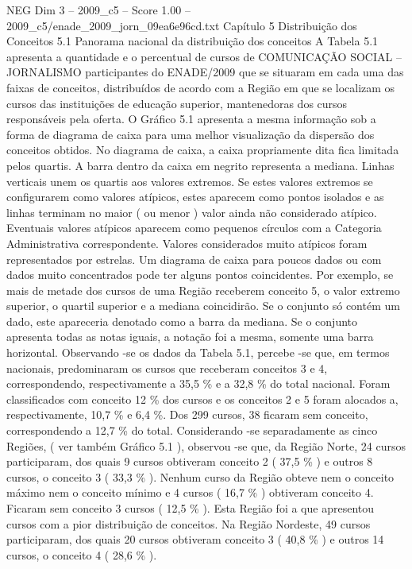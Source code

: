 \begin{textsample}{NEG Dim 3 – 2009\_c5 – Score 1.00 – 2009\_c5/enade\_2009\_jorn\_09ea6e96cd.txt}  \label{ex:f3_neg_112}
Capítulo 5 Distribuição dos Conceitos 5.1 Panorama nacional da distribuição dos conceitos A Tabela 5.1 apresenta a quantidade e o percentual de cursos de COMUNICAÇÃO SOCIAL – JORNALISMO participantes do ENADE/2009 que se situaram em cada uma das faixas de conceitos, distribuídos de acordo com a Região em que se localizam os cursos das instituições de educação superior, mantenedoras dos cursos responsáveis pela oferta.
O Gráfico 5.1 apresenta a mesma informação sob a forma de diagrama de caixa para uma melhor visualização da dispersão dos conceitos obtidos.
No diagrama de caixa, a caixa propriamente dita fica limitada pelos quartis.
A barra dentro da caixa em negrito representa a mediana.
Linhas verticais unem os quartis aos valores extremos.
Se estes valores extremos se configurarem como valores atípicos, estes aparecem como pontos isolados e as linhas terminam no maior ( ou menor ) valor ainda não considerado atípico.
Eventuais valores atípicos aparecem como pequenos círculos com a Categoria Administrativa correspondente.
Valores considerados muito atípicos foram representados por estrelas.
Um diagrama de caixa para poucos dados ou com dados muito concentrados pode ter alguns pontos coincidentes.
Por exemplo, se mais de metade dos cursos de uma Região receberem conceito 5, o valor extremo superior, o quartil superior e a mediana coincidirão.
Se o conjunto só contém um dado, este apareceria denotado como a barra da mediana.
Se o conjunto apresenta todas as notas iguais, a notação foi a mesma, somente uma barra horizontal.
Observando -se os dados da Tabela 5.1, percebe -se que, em termos nacionais, predominaram os cursos que receberam conceitos 3 e 4, correspondendo, respectivamente a 35,5 \% e a 32,8 \% do total nacional.
Foram classificados com conceito 12 \% dos cursos e os conceitos 2 e 5 foram alocados a, respectivamente, 10,7 \% e 6,4 \%.
Dos 299 cursos, 38 ficaram sem conceito, correspondendo a 12,7 \% do total.
Considerando -se separadamente as cinco Regiões, ( ver também Gráfico 5.1 ), observou -se que, da Região Norte, 24 cursos participaram, dos quais 9 cursos obtiveram conceito 2 ( 37,5 \% ) e outros 8 cursos, o conceito 3 ( 33,3 \% ).
Nenhum curso da Região obteve nem o conceito máximo nem o conceito mínimo e 4 cursos ( 16,7 \% ) obtiveram conceito 4.
Ficaram sem conceito 3 cursos ( 12,5 \% ).
Esta Região foi a que apresentou cursos com a pior distribuição de conceitos.
Na Região Nordeste, 49 cursos participaram, dos quais 20 cursos obtiveram conceito 3 ( 40,8 \% ) e outros 14 cursos, o conceito 4 ( 28,6 \% ).

\end{textsample}
